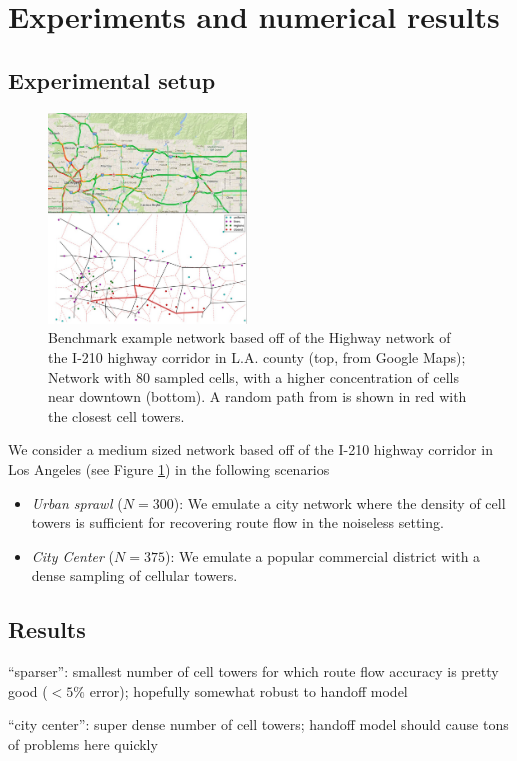 
\section{Experiments and numerical results}

\subsection{Experimental setup}
\begin{figure}[h!]
  \centering
    \includegraphics[width=0.47\textwidth]{figures/small_map_half.jpeg}
  \caption{\footnotesize{Benchmark example network based off of the Highway network of the I-210 highway corridor in L.A. county (top, from Google Maps); Network with 80 sampled cells, with a higher concentration of cells near downtown (bottom). A random path from is shown in red with the closest cell towers.}}
  \label{fig:small-network}
\end{figure}

We consider a medium sized network based off of the I-210 highway corridor in Los Angeles (see Figure \ref{fig:small-network}) in the following scenarios
\begin{itemize}
\item \textit{Urban sprawl} ($N=300$): We emulate a city network where the density of cell towers is sufficient for recovering route flow in the noiseless setting.
\item \textit{City Center} ($N=375$): We emulate a popular commercial district with a dense sampling of cellular towers.
\end{itemize}

\subsection{Results}

“sparser”: smallest number of cell towers for which route flow accuracy is pretty good ($<5\%$ error); hopefully somewhat robust to handoff model

“city center”: super dense number of cell towers; handoff model should cause tons of problems here quickly

